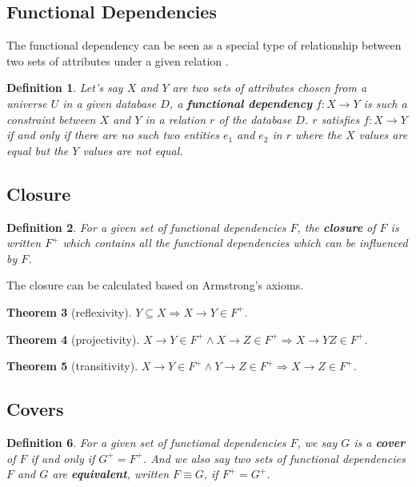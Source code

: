 \documentclass[11pt]{book}
\newtheorem{thm}{Theorem}[section]
\newtheorem{mydef}[thm]{Definition}
\begin{document}
\subsection{Functional Dependencies}

The functional dependency can be seen as a special type of relationship between two sets of attributes under a given relation \cite{beeri1979computational}.

\begin{mydef}
Let's say $X$ and $Y$ are two sets of attributes chosen from a universe $U$ in a given database $D$, a \textbf{functional dependency} $f: X \rightarrow Y$ is such a constraint between $X$ and $Y$ in a relation $r$ of the database $D$. $r$ satisfies $f: X \rightarrow Y$ if and only if there are no such two entities $e_1$ and $e_2$ in $r$ where the $X$ values are equal but the $Y$ values are not equal.
\end{mydef}

\subsection{Closure}

\begin{mydef}
For a given set of functional dependencies $F$, the \textbf{closure} of $F$ is written $F^+$ which contains all the functional dependencies which can be influenced by $F$. 
\end{mydef}

The closure can be calculated based on Armstrong's axioms.

\begin{thm}[reflexivity]
  $Y \subseteq X \Rightarrow X \to Y \in F^+$.
\end{thm}

\begin{thm}[projectivity]
  $X \rightarrow Y \in F^+ \land X \rightarrow Z \in F^+ \Rightarrow X \rightarrow YZ \in F^+$.
\end{thm}

\begin{thm}[transitivity]
  $X \rightarrow Y \in F^+ \land Y \rightarrow Z \in F^+ \Rightarrow X \rightarrow Z \in F^+$.
\end{thm}

\subsection{Covers}

\begin{mydef}
For a given set of functional dependencies $F$, we say $G$ is a \textbf{cover} of $F$ if and only if $G^+ = F^+$. And we also say two sets of functional dependencies $F$ and $G$ are \textbf{equivalent}, written $F \equiv G$, if $F^+ = G^+$.
\end{mydef}
\end{document}
